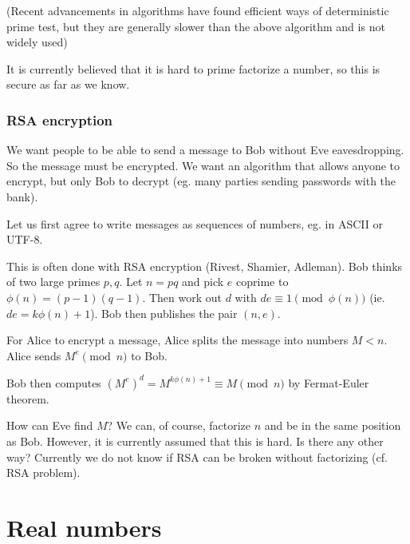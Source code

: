 \documentclass[a4paper]{article}
\begin{document}
  (Recent advancements in algorithms have found efficient ways of deterministic prime test, but they are generally slower than the above algorithm and is not widely used)

  It is currently believed that it is hard to prime factorize a number, so this is secure as far as we know.
  \subsubsection{RSA encryption}

  \begin{thm}
    We want people to be able to send a message to Bob without Eve eavesdropping. So the message must be encrypted. We want an algorithm that allows anyone to encrypt, but only Bob to decrypt (eg. many parties sending passwords with the bank).

    Let us first agree to write messages as sequences of numbers, eg. in ASCII or UTF-8.

    This is often done with RSA encryption (Rivest, Shamier, Adleman). Bob thinks of two large primes $p, q$. Let $n = pq$ and pick $e$ coprime to $\phi(n) = (p - 1)(q - 1)$. Then work out $d$ with $de \equiv 1\pmod {\phi(n)}$ (ie. $de = k\phi(n) + 1$). Bob then publishes the pair $(n, e)$.

    For Alice to encrypt a message, Alice splits the message into numbers $M < n$. Alice sends $M^e \pmod n$ to Bob.

    Bob then computes $(M^e)^d = M^{k\phi(n) + 1} \equiv M\pmod n$ by Fermat-Euler theorem.

    How can Eve find $M$? We can, of course, factorize $n$ and be in the same position as Bob. However, it is currently assumed that this is hard. Is there any other way? Currently we do not know if RSA can be broken without factorizing (cf. RSA problem).
  \end{thm}

  \section{Real numbers}
\end{document}
